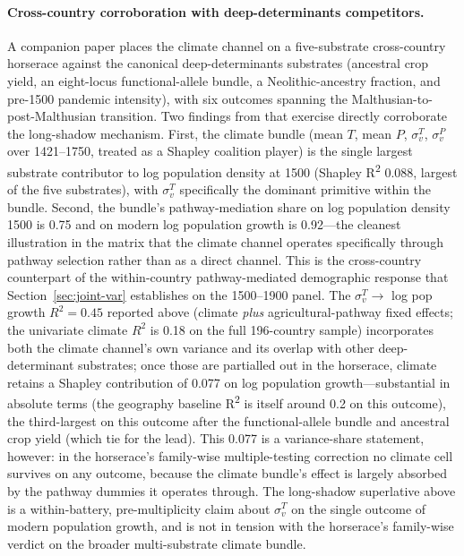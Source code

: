 \documentclass[11pt,letterpaper]{article}
\begin{document}
\paragraph{Cross-country corroboration with deep-determinants competitors.}
A companion paper \citep{alonso_horserace_v3} places the climate channel on a five-substrate cross-country horserace against the canonical deep-determinants substrates (ancestral crop yield, an eight-locus functional-allele bundle, a Neolithic-ancestry fraction, and pre-1500 pandemic intensity), with six outcomes spanning the Malthusian-to-post-Malthusian transition. Two findings from that exercise directly corroborate the long-shadow mechanism. First, the climate bundle (mean $T$, mean $P$, $\sigma_v^T$, $\sigma_v^P$ over 1421--1750, treated as a Shapley coalition player) is the single largest substrate contributor to log population density at 1500 (Shapley R\textsuperscript{2} 0.088, largest of the five substrates), with $\sigma_v^T$ specifically the dominant primitive within the bundle. Second, the bundle's pathway-mediation share on log population density 1500 is 0.75 and on modern log population growth is 0.92---the cleanest illustration in the matrix that the climate channel operates specifically through pathway selection rather than as a direct channel. This is the cross-country counterpart of the within-country pathway-mediated demographic response that Section~\ref{sec:joint-var} establishes on the 1500--1900 panel. The $\sigma_v^T \to$ log pop growth $R^2 = 0.45$ reported above (climate \emph{plus} agricultural-pathway fixed effects; the univariate climate $R^2$ is 0.18 on the full 196-country sample) incorporates both the climate channel's own variance and its overlap with other deep-determinant substrates; once those are partialled out in the horserace, climate retains a Shapley contribution of 0.077 on log population growth---substantial in absolute terms (the geography baseline R\textsuperscript{2} is itself around 0.2 on this outcome), the third-largest on this outcome after the functional-allele bundle and ancestral crop yield (which tie for the lead). This 0.077 is a variance-share statement, however: in the horserace's family-wise multiple-testing correction no climate cell survives on any outcome, because the climate bundle's effect is largely absorbed by the pathway dummies it operates through. The long-shadow superlative above is a within-battery, pre-multiplicity claim about $\sigma_v^T$ on the single outcome of modern population growth, and is not in tension with the horserace's family-wise verdict on the broader multi-substrate climate bundle.
\end{document}
